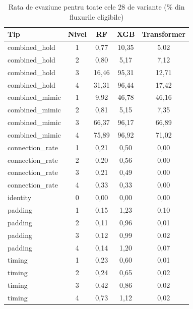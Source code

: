 \begin{table}[!ht]
    \caption{Rata de evaziune pentru toate cele 28 de variante (\% din fluxurile eligibile)}
    \centering\footnotesize
    \begin{tabular}{|l|c|c|c|c|}
        \hline
        \textbf{Tip} & \textbf{Nivel} & \textbf{RF} & \textbf{XGB} & \textbf{Transformer} \\
        \hline
        combined\_hold & 1 & 0,77 & 10,35 & 5,02 \\
        \hline
        combined\_hold & 2 & 0,80 & 5,17 & 7,12 \\
        \hline
        combined\_hold & 3 & 16,46 & 95,31 & 12,71 \\
        \hline
        combined\_hold & 4 & 31,31 & 96,44 & 17,42 \\
        \hline
        combined\_mimic & 1 & 9,92 & 46,78 & 46,16 \\
        \hline
        combined\_mimic & 2 & 0,81 & 5,15 & 7,35 \\
        \hline
        combined\_mimic & 3 & 66,37 & 96,17 & 66,89 \\
        \hline
        combined\_mimic & 4 & 75,89 & 96,92 & 71,02 \\
        \hline
        connection\_rate & 1 & 0,21 & 0,50 & 0,00 \\
        \hline
        connection\_rate & 2 & 0,20 & 0,56 & 0,00 \\
        \hline
        connection\_rate & 3 & 0,21 & 0,49 & 0,00 \\
        \hline
        connection\_rate & 4 & 0,33 & 0,33 & 0,00 \\
        \hline
        identity & 0 & 0,00 & 0,00 & 0,00 \\
        \hline
        padding & 1 & 0,15 & 1,23 & 0,10 \\
        \hline
        padding & 2 & 0,11 & 0,96 & 0,01 \\
        \hline
        padding & 3 & 0,12 & 0,99 & 0,02 \\
        \hline
        padding & 4 & 0,14 & 1,20 & 0,07 \\
        \hline
        timing & 1 & 0,23 & 0,60 & 0,01 \\
        \hline
        timing & 2 & 0,24 & 0,65 & 0,02 \\
        \hline
        timing & 3 & 0,42 & 0,86 & 0,02 \\
        \hline
        timing & 4 & 0,73 & 1,12 & 0,02 \\
        \hline

\end{tabular}
\end{table}
